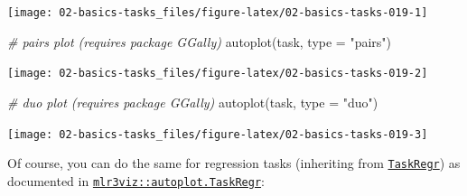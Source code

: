\documentclass[
]{scrbook}
\newenvironment{Shaded}{\begin{snugshade}}{\end{snugshade}}
\newcommand{\AttributeTok}[1]{\textcolor[rgb]{0.77,0.63,0.00}{#1}}
\newcommand{\CommentTok}[1]{\textcolor[rgb]{0.56,0.35,0.01}{\textit{#1}}}
\newcommand{\DecValTok}[1]{\textcolor[rgb]{0.00,0.00,0.81}{#1}}
\newcommand{\FunctionTok}[1]{\textcolor[rgb]{0.00,0.00,0.00}{#1}}
\newcommand{\NormalTok}[1]{#1}
\newcommand{\OtherTok}[1]{\textcolor[rgb]{0.56,0.35,0.01}{#1}}
\newcommand{\SpecialCharTok}[1]{\textcolor[rgb]{0.00,0.00,0.00}{#1}}
\newcommand{\StringTok}[1]{\textcolor[rgb]{0.31,0.60,0.02}{#1}}
\renewenvironment{Shaded} {\begin{snugshade}\small} {\end{snugshade}}
\begin{document}
\begin{center}\texttt{[image: 02-basics-tasks\_files/figure-latex/02-basics-tasks-019-1]} \end{center}

\begin{Shaded}
\begin{Highlighting}[]
\CommentTok{\# pairs plot (requires package GGally)}
\FunctionTok{autoplot}\NormalTok{(task, }\AttributeTok{type =} \StringTok{"pairs"}\NormalTok{)}
\end{Highlighting}
\end{Shaded}

\begin{center}\texttt{[image: 02-basics-tasks\_files/figure-latex/02-basics-tasks-019-2]} \end{center}

\begin{Shaded}
\begin{Highlighting}[]
\CommentTok{\# duo plot (requires package GGally)}
\FunctionTok{autoplot}\NormalTok{(task, }\AttributeTok{type =} \StringTok{"duo"}\NormalTok{)}
\end{Highlighting}
\end{Shaded}

\begin{center}\texttt{[image: 02-basics-tasks\_files/figure-latex/02-basics-tasks-019-3]} \end{center}

Of course, you can do the same for regression tasks (inheriting from \href{https://mlr3.mlr-org.com/reference/TaskRegr.html}{\texttt{TaskRegr}}) as documented in \href{https://mlr3viz.mlr-org.com/reference/autoplot.TaskRegr.html}{\texttt{mlr3viz::autoplot.TaskRegr}}:

\begin{Shaded}
\end{Shaded}
\end{document}
